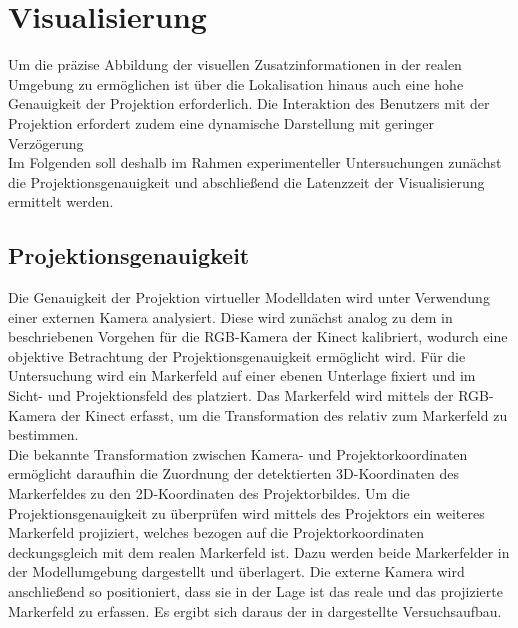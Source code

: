 
\prever{
}



\section{Visualisierung}
Um die präzise Abbildung der visuellen Zusatzinformationen in der realen Umgebung zu ermöglichen ist über die Lokalisation hinaus auch eine hohe Genauigkeit der Projektion erforderlich. Die Interaktion des Benutzers mit der Projektion erfordert zudem eine dynamische Darstellung mit geringer Verzögerung\\
Im Folgenden soll deshalb im Rahmen experimenteller Untersuchungen zunächst die Projektionsgenauigkeit und abschließend die Latenzzeit der Visualisierung ermittelt werden.

\subsection{Projektionsgenauigkeit}
Die Genauigkeit der Projektion virtueller Modelldaten wird unter Verwendung einer externen Kamera analysiert. Diese wird zunächst analog zu dem in  beschriebenen Vorgehen für die RGB-Kamera der Kinect kalibriert, wodurch eine objektive Betrachtung der Projektionsgenauigkeit ermöglicht wird. Für die Untersuchung wird ein Markerfeld auf einer ebenen Unterlage fixiert und im Sicht- und Projektionsfeld des  platziert. Das Markerfeld wird mittels der RGB-Kamera der Kinect erfasst, um die Transformation des  relativ zum Markerfeld zu bestimmen.\\

Die bekannte Transformation zwischen Kamera- und Projektorkoordinaten ermöglicht daraufhin die Zuordnung der detektierten 3D-Koordinaten des Markerfeldes zu den 2D-Koordinaten des Projektorbildes. Um die Projektionsgenauigkeit zu überprüfen wird mittels des Projektors ein weiteres Markerfeld projiziert, welches bezogen auf die Projektorkoordinaten deckungsgleich mit dem realen Markerfeld ist. Dazu werden beide Markerfelder in der Modellumgebung dargestellt und überlagert. Die externe Kamera wird anschließend so positioniert, dass sie in der Lage ist das reale und das projizierte Markerfeld zu erfassen. Es ergibt sich daraus der in  dargestellte Versuchsaufbau.\\

